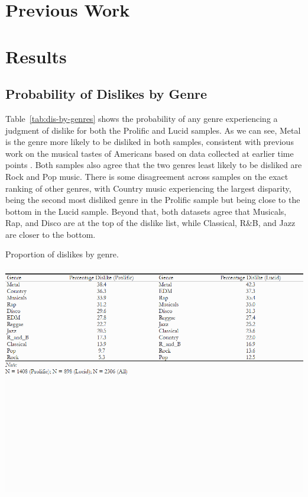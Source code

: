 \documentclass[12pt]{article}
\begin{document}
\section*{Previous Work}

\section*{Results}
\subsection*{Probability of Dislikes by Genre}
Table~\ref{tab:dis-by-genres} shows the probability of any genre experiencing a judgment of dislike for both the Prolific and Lucid samples. As we can see, Metal is the genre more likely to be disliked in both samples, consistent with previous work on the musical tastes of Americans based on data collected at earlier time points \citep{bryson1996anything-311, lizardo2015musical-8c6}. Both samples also agree that the two genres least likely to be disliked are Rock and Pop music. There is some disagreement across samples on the exact ranking of other genres, with Country music experiencing the largest disparity, being the second most disliked genre in the Prolific sample but being close to the bottom in the Lucid sample. Beyond that, both datasets agree that Musicals, Rap, and Disco are at the top of the dislike list, while Classical, R\&B, and Jazz are closer to the bottom. 

\begin{table}[ht!]
    \caption{Proportion of dislikes by genre.}
    \includegraphics[trim={0 9cm 0 0},clip, width=1.0\textwidth]{Tabs/desc-tab-dislike.png}
    \label{tab:dis-by-genres}
\end{table}
\end{document}
